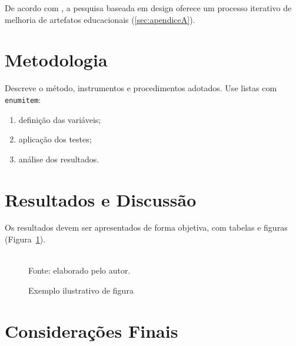 \documentclass[12pt,oneside]{article}
\begin{document}
De acordo com \cite{pimentelDesignScienceResearch2020}, a pesquisa baseada em
design oferece um processo iterativo de melhoria de artefatos educacionais
(\ref{sec:apendiceA}).

\section{Metodologia}\label{sec:metodologia}

Descreve o método, instrumentos e procedimentos adotados.  
Use listas com \texttt{enumitem}:
\begin{enumerate}[label=\alph*), itemsep=0pt, topsep=0pt, parsep=0pt, partopsep=0pt]
  \item definição das variáveis;
  \item aplicação dos testes;
  \item análise dos resultados.
\end{enumerate}

\section{Resultados e Discussão}\label{sec:resultadosDiscussao}

Os resultados devem ser apresentados de forma objetiva, com tabelas e figuras
(Figura~\ref{fig:exemplo}).

\begin{figure}[ht]
\centering
\caption{Exemplo ilustrativo de figura}
\begingroup
\setlength{\fboxsep}{0pt}
\endgroup
\\[2pt]
{\small Fonte: elaborado pelo autor.}
\label{fig:exemplo}
\end{figure}
\vspace{-6pt}

\section{Considerações Finais}\label{sec:consideracoesFinais}
\end{document}
